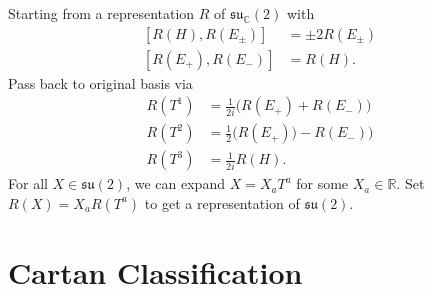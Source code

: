 Starting from a representation $R$ of $\mathfrak{su}_{\mathbb{C}}(2)$ with
\begin{subequations}
  \begin{align}
    \label{eq:15-star2}
    [R(H), R(E_{\pm})] &= \pm 2 R(E_\pm) \\
    [R(E_+), R(E_-)] &= R(H).
  \end{align}
\end{subequations}
Pass back to original basis via
\begin{subequations}
  \begin{align}
    R(T^1) &= \frac{1}{2i} \bigl(R(E_+) + R(E_-)\bigr) \\
    R(T^2) &= \frac{1}{2} \bigl(R(E_+)) - R(E_-)\bigr) \\
    R(T^3) &= \frac{1}{2i} R(H).
  \end{align}
\end{subequations}
For all $X \in \mathfrak{su}(2)$, we can expand $X = X_{a} T^{a}$ for some ${X_{a} \in \mathbb{R}}$. Set $R(X) = X_{a} R(T^{a})$ to get a representation of $\mathfrak{su}(2)$.


\section{Cartan Classification}%
\label{sec:cartan_classification}

